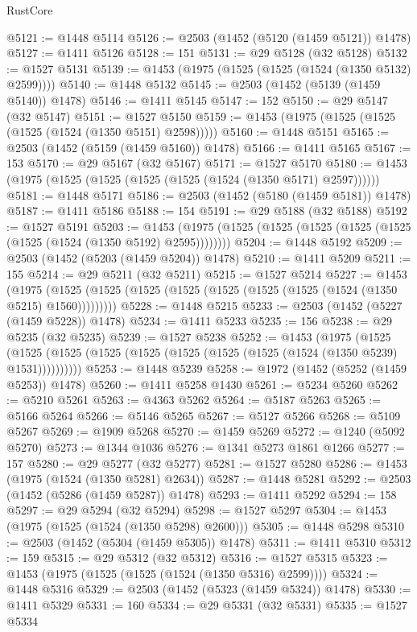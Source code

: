 \begin{lexlean}{RustCore}
\begin{coremodule}
@5121 := @1448 @5114
@5126 := @2503 (@1452 (@5120 (@1459 @5121)) @1478)
@5127 := @1411 @5126
@5128 := 151
@5131 := @29 @5128 (@32 @5128)
@5132 := @1527 @5131
@5139 := @1453 (@1975 (@1525 (@1525 (@1524 (@1350 @5132) @2599))))
@5140 := @1448 @5132
@5145 := @2503 (@1452 (@5139 (@1459 @5140)) @1478)
@5146 := @1411 @5145
@5147 := 152
@5150 := @29 @5147 (@32 @5147)
@5151 := @1527 @5150
@5159 := @1453 (@1975 (@1525 (@1525 (@1525 (@1524 (@1350 @5151) @2598)))))
@5160 := @1448 @5151
@5165 := @2503 (@1452 (@5159 (@1459 @5160)) @1478)
@5166 := @1411 @5165
@5167 := 153
@5170 := @29 @5167 (@32 @5167)
@5171 := @1527 @5170
@5180 := @1453 (@1975 (@1525 (@1525 (@1525 (@1525 (@1524 (@1350 @5171) @2597))))))
@5181 := @1448 @5171
@5186 := @2503 (@1452 (@5180 (@1459 @5181)) @1478)
@5187 := @1411 @5186
@5188 := 154
@5191 := @29 @5188 (@32 @5188)
@5192 := @1527 @5191
@5203 := @1453 (@1975 (@1525 (@1525 (@1525 (@1525 (@1525 (@1525 (@1524 (@1350 @5192) @2595))))))))
@5204 := @1448 @5192
@5209 := @2503 (@1452 (@5203 (@1459 @5204)) @1478)
@5210 := @1411 @5209
@5211 := 155
@5214 := @29 @5211 (@32 @5211)
@5215 := @1527 @5214
@5227 := @1453
    (@1975 (@1525 (@1525 (@1525 (@1525 (@1525 (@1525 (@1525 (@1524 (@1350 @5215) @1560)))))))))
@5228 := @1448 @5215
@5233 := @2503 (@1452 (@5227 (@1459 @5228)) @1478)
@5234 := @1411 @5233
@5235 := 156
@5238 := @29 @5235 (@32 @5235)
@5239 := @1527 @5238
@5252 := @1453
    (@1975
      (@1525 (@1525 (@1525 (@1525 (@1525 (@1525 (@1525 (@1525 (@1524 (@1350 @5239) @1531))))))))))
@5253 := @1448 @5239
@5258 := @1972 (@1452 (@5252 (@1459 @5253)) @1478)
@5260 := @1411 @5258 @1430
@5261 := @5234 @5260
@5262 := @5210 @5261
@5263 := @4363 @5262
@5264 := @5187 @5263
@5265 := @5166 @5264
@5266 := @5146 @5265
@5267 := @5127 @5266
@5268 := @5109 @5267
@5269 := @1909 @5268
@5270 := @1459 @5269
@5272 := @1240 (@5092 @5270)
@5273 := @1344 @1036
@5276 := @1341 @5273 @1861 @1266
@5277 := 157
@5280 := @29 @5277 (@32 @5277)
@5281 := @1527 @5280
@5286 := @1453 (@1975 (@1524 (@1350 @5281) @2634))
@5287 := @1448 @5281
@5292 := @2503 (@1452 (@5286 (@1459 @5287)) @1478)
@5293 := @1411 @5292
@5294 := 158
@5297 := @29 @5294 (@32 @5294)
@5298 := @1527 @5297
@5304 := @1453 (@1975 (@1525 (@1524 (@1350 @5298) @2600)))
@5305 := @1448 @5298
@5310 := @2503 (@1452 (@5304 (@1459 @5305)) @1478)
@5311 := @1411 @5310
@5312 := 159
@5315 := @29 @5312 (@32 @5312)
@5316 := @1527 @5315
@5323 := @1453 (@1975 (@1525 (@1525 (@1524 (@1350 @5316) @2599))))
@5324 := @1448 @5316
@5329 := @2503 (@1452 (@5323 (@1459 @5324)) @1478)
@5330 := @1411 @5329
@5331 := 160
@5334 := @29 @5331 (@32 @5331)
@5335 := @1527 @5334

\end{coremodule}
\end{lexlean}
